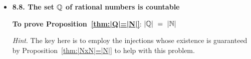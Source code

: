 \begin{itemize}
\smallskip

Say that each subset-$k$ element $2^k m$ of $S$ is {\it associated with} its odd divisor $m$.

\medskip

Now, since set $S$ consists of the first $2n$ integers, it contains $n$ {\em odd} integers.  Since our challenge begins by removing $n+1$ elements from $S$, the Pigeonhole Principle assures us that some two of the removed integers are {\em associated with} the same odd number $m$.  Stated differently: some removed integer has the form $2^{k_1} \times m$ while another has the form $2^{k_2} \times m$.

\smallskip

The smaller of these removed integers divides the larger one.  \qed


\medskip\item
{\bf 8.8. The set $\mathbb{Q}$ of rational numbers is countable}

\smallskip

{\bf To prove Proposition~\ref{thm:|Q|=|N|}}: $|\mathbb{Q}| \ = \ |\mathbb{N}|$

\smallskip

{\em Hint}.
The key here is to employ the injections whose existence is guaranteed by Proposition~\ref{thm:|NxN|=|N|} to help with this problem.
\end{itemize}




